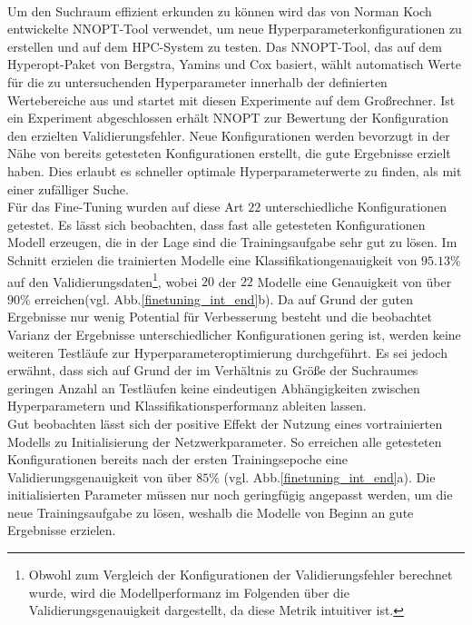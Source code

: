 \\
Um den Suchraum effizient erkunden zu können wird das von Norman Koch entwickelte NNOPT-Tool verwendet, um neue Hyperparameterkonfigurationen zu erstellen und auf dem HPC-System zu testen. Das NNOPT-Tool, das auf dem Hyperopt-Paket \cite{hyperopt} von Bergstra, Yamins und Cox basiert, wählt automatisch Werte für die zu untersuchenden Hyperparameter innerhalb der definierten Wertebereiche aus und startet mit diesen Experimente auf dem Großrechner. Ist ein Experiment abgeschlossen erhält NNOPT zur Bewertung der Konfiguration den erzielten Validierungsfehler. Neue Konfigurationen werden bevorzugt in der Nähe von bereits getesteten Konfigurationen erstellt, die gute Ergebnisse erzielt haben. Dies erlaubt es schneller optimale Hyperparameterwerte zu finden, als mit einer zufälliger Suche.
\\
Für das Fine-Tuning wurden auf diese Art $22$ unterschiedliche Konfigurationen getestet. Es lässt sich beobachten, dass fast alle getesteten Konfigurationen Modell erzeugen, die in der Lage sind die Trainingsaufgabe sehr gut zu lösen. Im Schnitt erzielen die trainierten Modelle eine Klassifikationgenauigkeit von $95.13\%$ auf den Validierungsdaten\footnote{Obwohl zum Vergleich der Konfigurationen der Validierungsfehler berechnet wurde, wird die Modellperformanz im Folgenden über die Validierungsgenauigkeit dargestellt, da diese Metrik intuitiver ist.}, wobei $20$ der $22$ Modelle eine Genauigkeit von über $90\%$ erreichen(vgl. Abb.\ref{finetuning_int_end}b). Da auf Grund der guten Ergebnisse nur wenig Potential für Verbesserung besteht und die beobachtet Varianz der Ergebnisse unterschiedlicher Konfigurationen gering ist, werden keine weiteren Testläufe zur Hyperparameteroptimierung durchgeführt. Es sei jedoch erwähnt, dass sich auf Grund der im Verhältnis zu Größe der Suchraumes geringen Anzahl an Testläufen keine eindeutigen Abhängigkeiten zwischen Hyperparametern und Klassifikationsperformanz ableiten lassen.
\\
Gut beobachten lässt sich der positive Effekt der Nutzung eines vortrainierten Modells zu Initialisierung der Netzwerkparameter. So erreichen alle getesteten Konfigurationen bereits nach der ersten Trainingsepoche eine Validierungsgenauigkeit von über $85\%$ (vgl. Abb.\ref{finetuning_int_end}a). Die initialisierten Parameter müssen nur noch geringfügig angepasst werden, um die neue Trainingsaufgabe zu lösen, weshalb die Modelle von Beginn an gute Ergebnisse erzielen. 
\\

